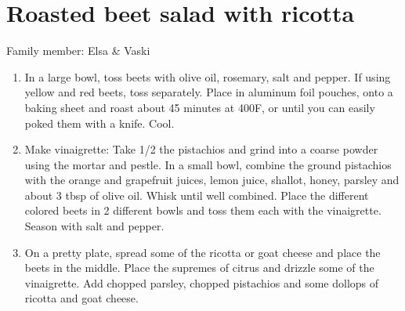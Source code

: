 \chapter{Roasted beet salad with ricotta}
\label{ch:roasted-beet-salad}

Family member: Elsa \& Vaski


\begin{enumerate}
    \item  In a large bowl, toss beets with olive oil, rosemary, salt and pepper. If using yellow and red beets, toss separately. Place in aluminum foil pouches, onto a baking sheet and roast about 45 minutes at 400\degree F, or until you can easily poked them with a knife. Cool.
    \item Make vinaigrette: Take 1/2 the pistachios and grind into a coarse powder using the mortar and pestle. In a small bowl, combine the ground pistachios with the orange and grapefruit juices, lemon juice, shallot, honey, parsley and about 3 tbsp of olive oil. Whisk until well combined. Place the different colored beets in 2 different bowls and toss them each with the vinaigrette. Season with salt and pepper.
    \item On a pretty plate, spread some of the ricotta or goat cheese and place the beets in the middle. Place the supremes of citrus and drizzle some of the vinaigrette. Add chopped parsley, chopped pistachios and some dollops of ricotta and goat cheese.
\end{enumerate}

